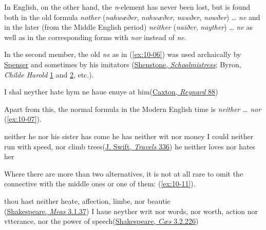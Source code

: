 In English, on the other hand, the \textit{n}-element has never been lost, but is found both in the old formula \textit{nother} (\textit{nahwæðer}, \textit{nohwæðer}, \textit{nawðer}, \textit{nowðer}) {\dots} \textit{ne} and in the later (from the Middle English period) \textit{neither} (\textit{naiðer}, \textit{nayther}) {\dots} \textit{ne} as well as in the corresponding forms with \textit{nor} instead of \textit{ne}.

In the second member, the old \textit{ne} as in (\ref{ex:10-06}) was used archaically by \href{https://archive.org/details/spensersfaeriequ01spenuoft/page/12/mode/2up?q=%22+ne+%22}{Spenser} %
and sometimes by his imitators (\href{https://archive.org/details/poeticalworksofw00shen2/page/262/mode/2up?view=theater&q=%22ne+superstition%22}{Shenstone, \textit{Schoolmistress}}; %
Byron, \textit{Childe Harold} \href{https://archive.org/details/childeharoldspi10byrogoog/page/n22/mode/2up?q=%22Ne+barrier%22&view=theater}{1} and \href{https://archive.org/details/childeharoldspi10byrogoog/page/n62/mode/2up?q=%22Ne*+citjr%27s%22&view=theater}{2}, etc.).

\ea \label{ex:10-06}
I shal neyther hate hym ne haue enuye at him\hfill(\href{https://archive.org/details/TheHistoryOfReynardTheFoxArber/page/n117/mode/2up?q=%22neyther+hate+hym%22&view=theater}{Caxton, \textit{Reynard} 88})
\z

Apart from this, the normal formula in the Modern English time is \textit{neither {\dots} nor} (\ref{ex:10-07}).

\ea \label{ex:10-07}
\ea
neither he nor his sister has come
\ex
he has neither wit nor money
\ex
I could neither run with speed, nor climb trees\hfill(\href{https://archive.org/details/bim_eighteenth-century_the-works-of-j-s-dd-_swift-jonathan_1735_3/page/338/mode/2up?view=theater&q=%22run+with+speed%22}{J. Swift, \textit{Travels} 336}) 
\ex
he neither loves nor hates her
\z
\z

Where there are more than two alternatives, it is not at all rare to omit the connective with the middle ones or one of them: (\ref{ex:10-11}).

\ea \label{ex:10-11}
\ea
thou hast neither heate, affection, limbe, nor beautie\\\hfill(\href{https://internetshakespeare.uvic.ca/doc/MM_F1/scene/3.1/index.html#tln-1240}{Shakespeare, \textit{Meas} 3.1.37})
\ex
I haue neyther writ nor words, nor worth, action nor vtterance, nor the power of speech\hfill(\href{https://internetshakespeare.uvic.ca/doc/JC_F1/scene/3.2/index.html#tln-1755}{Shakespeare, \textit{Cæs} 3.2.226}) %
\z
\z

